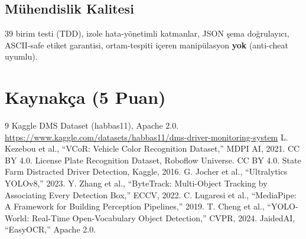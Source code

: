 \documentclass[onecolumn,11pt]{IEEEtran}
\begin{document}
\subsection{Mühendislik Kalitesi}
39 birim testi (TDD), izole hata-yönetimli katmanlar, JSON şema doğrulayıcı,
ASCII-safe etiket garantisi, ortam-tespiti içeren manipülasyon \textbf{yok}
(anti-cheat uyumlu).

\section{Kaynakça (5 Puan)}
\begin{thebibliography}{9}
\footnotesize
{} Kaggle DMS Dataset (habbas11), Apache 2.0.
  \url{https://www.kaggle.com/datasets/habbas11/dms-driver-monitoring-system}
 L. Kezebou et al., ``VCoR: Vehicle Color Recognition Dataset,'' MDPI AI, 2021. CC BY 4.0.
 License Plate Recognition Dataset, Roboflow Universe. CC BY 4.0.
 State Farm Distracted Driver Detection, Kaggle, 2016.
 G. Jocher et al., ``Ultralytics YOLOv8,'' 2023.
 Y. Zhang et al., ``ByteTrack: Multi-Object Tracking by Associating Every Detection Box,'' ECCV, 2022.
 C. Lugaresi et al., ``MediaPipe: A Framework for Building Perception Pipelines,'' 2019.
 T. Cheng et al., ``YOLO-World: Real-Time Open-Vocabulary Object Detection,'' CVPR, 2024.
 JaidedAI, ``EasyOCR,'' Apache 2.0.
\end{thebibliography}
\end{document}
